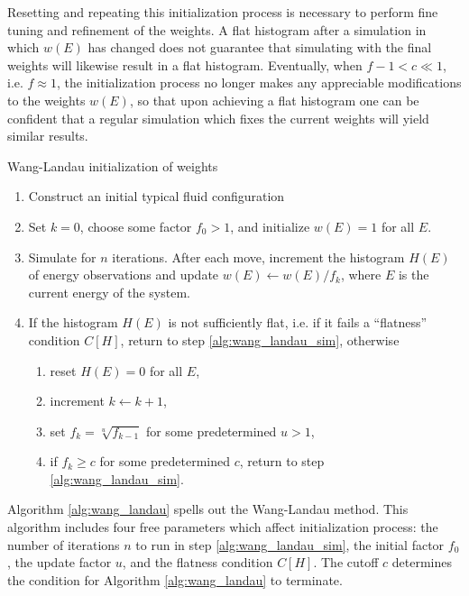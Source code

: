 \documentclass[11pt]{article}
\newcommand{\p}[1]{\left(#1\right)} %
\renewcommand{\sp}[1]{\left[#1\right]} %
\newenvironment{alg}
{\hrulefill\begin{enumerate}}
{\end{enumerate}\hrulefill}
\begin{document}
Resetting and repeating this initialization process is necessary to
perform fine tuning and refinement of the weights. A flat histogram
after a simulation in which $w\p{E}$ has changed does not guarantee
that simulating with the final weights will likewise result in a flat
histogram. Eventually, when $f-1<c\ll 1$, i.e. $f\approx 1$, the
initialization process no longer makes any appreciable modifications
to the weights $w\p{E}$, so that upon achieving a flat histogram one
can be confident that a regular simulation which fixes the current
weights will yield similar results.

\begin{algorithm}[tb]
  \caption{Wang-Landau initialization of weights}
  \label{alg:wang_landau}
  \begin{alg}

  \item Construct an initial typical fluid configuration

  \item Set $k=0$, choose some factor $f_0>1$, and initialize
    $w\p{E}=1$ for all $E$.

  \item Simulate for $n$ iterations. After each move, increment the
    histogram $H\p{E}$ of energy observations and update
    $w\p{E}\leftarrow w\p{E}/f_k$, where $E$ is the current energy of
    the system.
    \label{alg:wang_landau_sim}

  \item If the histogram $H\p{E}$ is not sufficiently flat, i.e. if it
    fails a ``flatness'' condition $C\sp{H}$, return to step
    \ref{alg:wang_landau_sim}, otherwise
    \begin{enumerate}
    \item reset $H\p{E}=0$ for all $E$,
    \item increment $k\leftarrow k+1$,
    \item set $f_k=\sqrt[u]{f_{k-1}}$ for some predetermined $u>1$,
      \label{alg:wang_landau_update}
    \item if $f_k\ge c$ for some predetermined $c$, return to step
      \ref{alg:wang_landau_sim}.
      \label{alg:wang_landau_end}
    \end{enumerate}

  \end{alg}
\end{algorithm}

Algorithm \ref{alg:wang_landau} spells out the Wang-Landau
method. This algorithm includes four free parameters which affect
initialization process: the number of iterations $n$ to run in step
\ref{alg:wang_landau_sim}, the initial factor $f_0$, the update factor
$u$, and the flatness condition $C\sp{H}$. The cutoff $c$ determines
the condition for Algorithm \ref{alg:wang_landau} to terminate.
\end{document}
